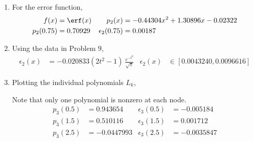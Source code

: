 \begin{enumerate}
    \item For the error function,
          \begin{align}
              f(x)             & = \erf(x)                               &
              p_2(x)           & = - 0.44304 x^{2} + 1.30896 x - 0.02322   \\
              p_2(0.75)        & = 0.70929                               &
              \epsilon_2(0.75) & = 0.00187
          \end{align}

    \item Using the data in Problem $ 9 $,
          \begin{align}
              \epsilon_2(x) & = -0.020833 (2t^2 - 1)\ \frac{e^{-t^2}}{\sqrt{\pi}} &
              \epsilon_2(x) & \in [0.0043240, 0.0096616]
          \end{align}

    \item Plotting the individual polynomials $ L_k $,
          \begin{figure}[H]
              \centering
          \end{figure}
          Note that only one polynomial is nonzero at each node.
          \begin{align}
              p_3(0.5) & = 0.943654   & \epsilon_3(0.5) & = -0.005184  \\
              p_3(1.5) & = 0.510116   & \epsilon_3(1.5) & = 0.001712   \\
              p_3(2.5) & = -0.0447993 & \epsilon_3(2.5) & = -0.0035847
          \end{align}


\end{enumerate}
